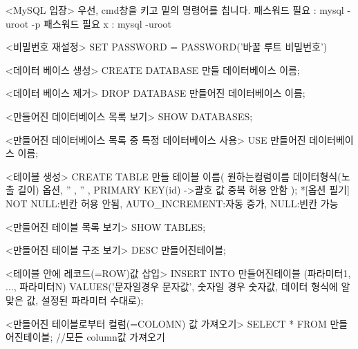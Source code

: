 <MySQL 입장>
우선, cmd창을 키고 밑의 명령어를 칩니다.
패스워드 필요 : mysql -uroot -p 
패스워드 필요 x : mysql -uroot

<비밀번호 재설정>
SET PASSWORD = PASSWORD('바꿀 루트 비밀번호')

<데이터 베이스 생성>
CREATE DATABASE 만들 데이터베이스 이름;

<데이터 베이스 제거>
DROP DATABASE 만들어진 데이터베이스 이름;

<만들어진 데이터베이스 목록 보기>
SHOW DATABASES;

<만들어진 데이터베이스 목록 중 특정 데이터베이스 사용>
USE 만들어진 데이터베이스 이름;

<테이블 생성>
CREATE TABLE 만들 테이블 이름(
  원하는컬럼이름 데이터형식(노출 길이) 옵션,
             ''                        ,
             ''                        , 
  PRIMARY KEY(id)      ->괄호 값 중복 허용 안함     
); 
*[옵션 필기] 
NOT NULL:빈칸 허용 안됨, AUTO_INCREMENT:자동 증가, NULL:빈칸 가능

<만들어진 테이블 목록 보기>
SHOW TABLES;

<만들어진 테이블 구조 보기>
DESC 만들어진테이블;

<테이블 안에 레코드(=ROW)값 삽입>
INSERT INTO 만들어진테이블 (파라미터1, ..., 파라미터N) VALUES('문자일경우 문자값', 숫자일 경우 숫자값, 데이터 형식에 알맞은 값, 설정된 파라미터 수대로);

<만들어진 테이블로부터 컬럼(=COLOMN) 값 가져오기>
SELECT * FROM 만들어진테이블; //모든 column값 가져오기


